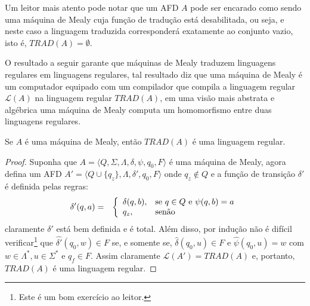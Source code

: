 
\begin{remark}
	Um leitor mais atento pode notar que um AFD $A$ pode ser encarado como sendo uma máquina de Mealy cuja função de tradução está desabilitada, ou seja,  e neste caso a linguagem traduzida corresponderá exatamente ao conjunto vazio, isto é, $TRAD(A) = \emptyset$.
\end{remark}

O resultado a seguir garante que máquinas de Mealy traduzem linguagens regulares em linguagens regulares,  tal resultado diz que uma máquina de Mealy é um computador equipado com um compilador que compila a linguagem regular $\mathcal{L}(A)$ na  linguagem regular $TRAD(A)$, em uma visão mais abstrata e algébrica uma máquina de Mealy computa um homomorfismo entre duas linguagens regulares.

\begin{theorem}
	Se $A$ é uma máquina de Mealy, então $TRAD(A)$ é uma linguagem regular.
\end{theorem}

\begin{proof}
	Suponha que  $A = \langle Q, \Sigma, \Lambda, \delta, \psi, q_0, F\rangle$ é uma máquina de Mealy, agora defina um AFD $A' = \langle Q \cup \{q_z\}, \Lambda, \delta', q_0, F \rangle$ onde $q_z \notin Q$ e a função de transição $\delta'$ é definida pelas regras: 
	\begin{eqnarray*}
		\delta'(q, a) & = & \left\{\begin{array}{ll}	\delta(q, b) , & \hbox{se } q \in Q \text{ e } \psi(q, b) = a\\	q_z,  & \hbox{senão}\end{array}\right.
	\end{eqnarray*}
	claramente $\delta'$ está bem definida e é total. Além disso, por indução não é difícil verificar\footnote{Este é um bom exercício ao leitor.} que $\widehat{\delta'}(q_0, w) \in F$ se, e somente se, $\widehat{\delta}(q_0, u) \in F$ e $\widehat{\psi}(q_0, u) = w$ com $w \in \Lambda^*, u \in \Sigma^*$ e $q_f \in F$. Assim claramente $\mathcal{L}(A') = TRAD(A)$ e, portanto, $TRAD(A)$ é uma linguagem regular.
\end{proof}

